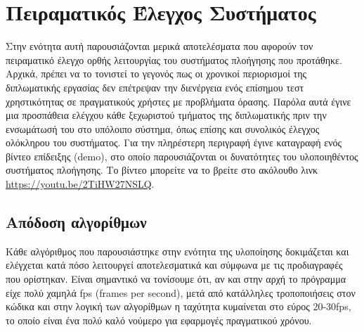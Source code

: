 \chapter{Πειραματικός Έλεγχος Συστήματος} \label{ch:demo}

Στην ενότητα αυτή παρουσιάζονται μερικά αποτελέσματα που αφορούν τον πειραματικό έλεγχο ορθής λειτουργίας του συστήματος πλοήγησης που προτάθηκε. Αρχικά, πρέπει να το τονιστεί το γεγονός πως οι χρονικοί περιορισμοί της διπλωματικής εργασίας δεν επέτρεψαν την διενέργεια ενός επίσημου τεστ χρηστικότητας σε πραγματικούς χρήστες με προβλήματα όρασης. Παρόλα αυτά έγινε μια προσπάθεια ελέγχου κάθε ξεχωριστού τμήματος της διπλωματικής πριν την ενσωμάτωσή του στο υπόλοιπο σύστημα, όπως επίσης και συνολικός έλεγχος ολόκληρου του συστήματος. Για την πληρέστερη περιγραφή έγινε καταγραφή ενός βίντεο επίδειξης (demo), στο οποίο παρουσιάζονται οι δυνατότητες του υλοποιηθέντος συστήματος πλοήγησης. Το βίντεο μπορείτε να το βρείτε στο ακόλουθο λινκ \url{https://youtu.be/2TiHW27NSLQ}.

\section{Απόδοση αλγορίθμων}
Κάθε αλγόριθμος που παρουσιάστηκε στην ενότητα της υλοποίησης δοκιμάζεται και ελέγχεται κατά πόσο λειτουργεί αποτελεσματικά και σύμφωνα με τις προδιαγραφές που ορίστηκαν. Είναι σημαντικό να τονίσουμε ότι, αν και στην αρχή το πρόγραμμα είχε πολύ χαμηλά fps (frames per second), μετά από κατάλληλες τροποποιήσεις στον κώδικα και στην λογική των αλγορίθμων η ταχύτητα κυμαίνεται στο εύρος 20-30fps, το οποίο είναι ένα πολύ καλό νούμερο για εφαρμογές πραγματικού χρόνου.

